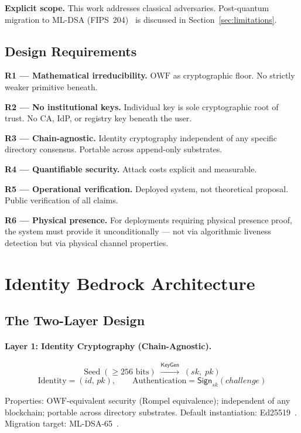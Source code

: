 \documentclass[11pt,a4paper]{article}
\theoremstyle{definition}
\newcommand{\OWF}{\mathrm{OWF}}
\begin{document}
\textbf{Explicit scope.} This work addresses classical adversaries.
Post-quantum migration to ML-DSA (FIPS~204)~\cite{FIPS204} is
discussed in Section~\ref{sec:limitations}.

\subsection{Design Requirements}

\textbf{R1 --- Mathematical irreducibility.} $\OWF$ as cryptographic
floor. No strictly weaker primitive beneath.

\textbf{R2 --- No institutional keys.} Individual key is sole
cryptographic root of trust. No CA, IdP, or registry key beneath
the user.

\textbf{R3 --- Chain-agnostic.} Identity cryptography independent of
any specific directory consensus. Portable across append-only
substrates.

\textbf{R4 --- Quantifiable security.} Attack costs explicit and
measurable.

\textbf{R5 --- Operational verification.} Deployed system, not
theoretical proposal. Public verification of all claims.

\textbf{R6 --- Physical presence.} For deployments requiring physical
presence proof, the system must provide it unconditionally --- not
via algorithmic liveness detection but via physical channel
properties.

\section{Identity Bedrock Architecture}
\label{sec:architecture}

\subsection{The Two-Layer Design}

\paragraph{Layer 1: Identity Cryptography (Chain-Agnostic).}
\[
\text{Seed} \;(\geq 256\text{ bits}) \;\xrightarrow{\mathsf{KeyGen}}\;
(\mathit{sk},\; \mathit{pk})
\]
\[
\text{Identity} = (\mathit{id},\, \mathit{pk}), \qquad
\text{Authentication} = \mathsf{Sign}_{\mathit{sk}}(\mathit{challenge})
\]

Properties: $\OWF$-equivalent security (Rompel equivalence);
independent of any blockchain; portable across directory substrates.
Default instantiation: Ed25519~\cite{RFC8032}. Migration target:
ML-DSA-65~\cite{FIPS204}.
\end{document}
